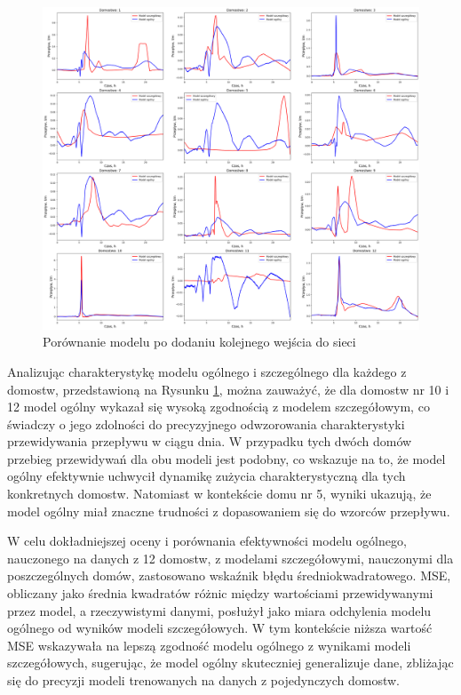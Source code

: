 \documentclass[a4paper,twoside,12pt]{book}
\begin{document}
\begin{figure}[!h]
  \centering
  \includegraphics[width=1\textwidth]{img/szczegółowy_ogolny_porówniaie_dodatkowy.png}
  \caption{Porównanie modelu po dodaniu kolejnego wejścia do sieci}
  \label{fig:porownianie_dodatkowy}
\end{figure}

Analizując charakterystykę modelu ogólnego i szczególnego dla każdego z domostw, przedstawioną na Rysunku \ref{fig:porownianie_dodatkowy}, można zauważyć, że dla domostw nr 10 i 12 model ogólny wykazał się wysoką zgodnością z modelem szczegółowym, co świadczy o jego zdolności do precyzyjnego odwzorowania charakterystyki przewidywania przepływu w ciągu dnia. W przypadku tych dwóch domów przebieg przewidywań dla obu modeli jest podobny, co wskazuje na to, że model ogólny efektywnie uchwycił dynamikę zużycia charakterystyczną dla tych konkretnych domostw. Natomiast w kontekście domu nr 5, wyniki ukazują, że model ogólny miał znaczne trudności z dopasowaniem się do wzorców przepływu.

W celu dokładniejszej oceny i porównania efektywności modelu ogólnego, nauczonego na danych z 12 domostw, z modelami szczegółowymi, nauczonymi dla poszczególnych domów, zastosowano wskaźnik błędu średniokwadratowego. MSE, obliczany jako średnia kwadratów różnic między wartościami przewidywanymi przez model, a rzeczywistymi danymi, posłużył jako miara odchylenia modelu ogólnego od wyników modeli szczegółowych. W tym kontekście niższa wartość MSE wskazywała na lepszą zgodność modelu ogólnego z wynikami modeli szczegółowych, sugerując, że model ogólny skuteczniej generalizuje dane, zbliżając się do precyzji modeli trenowanych na danych z pojedynczych domostw.
\end{document}
